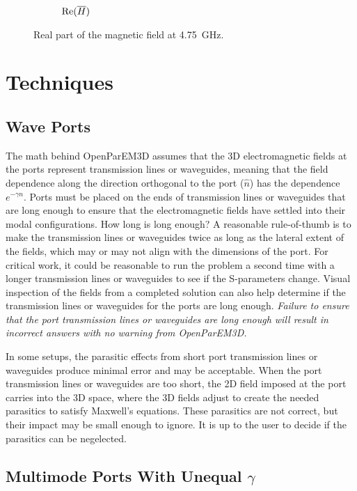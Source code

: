\documentclass[titlepage]{article}
\renewcommand\_{\textunderscore\linebreak[1]}
\begin{document}
\begin{itemize}
\begin{figure}[H]
\begin{subfigure}{0.6\textwidth}
     \caption{$\textnormal{Re}(\overline{H})$}
  \end{subfigure}
  \caption{Real part of the magnetic field at 4.75~GHz.}
  \label{fig:monopole_ReH}
\end{figure}


\end{itemize}

\section{Techniques}

\subsection{Wave Ports}

The math behind OpenParEM3D assumes that the 3D electromagnetic fields at the ports represent transmission lines or waveguides, meaning that the field dependence along the direction orthogonal to the port ($\hat{n}$) has the dependence $e^{-\gamma n}$.  Ports must be placed on the ends of transmission lines or waveguides that are long enough to ensure that the electromagnetic fields have settled into their modal configurations.  How long is long enough?  A reasonable rule-of-thumb is to make the transmission lines or waveguides twice as long as the lateral extent of the fields, which may or may not align with the dimensions of the port.  For critical work, it could be reasonable to run the problem a second time with a longer transmission lines or waveguides to see if the S-parameters change.  Visual inspection of the fields from a completed solution can also help determine if the transmission lines or waveguides for the ports are long enough.  \textit{Failure to ensure that the port transmission lines or waveguides are long enough will result in incorrect answers with no warning from OpenParEM3D.}

In some setups, the parasitic effects from short port transmission lines or waveguides produce minimal error and may be acceptable.  When the port transmission lines or waveguides are too short, the 2D field imposed at the port carries into the 3D space, where the 3D fields adjust to create the needed parasitics to satisfy Maxwell's equations.  These parasitics are not correct, but their impact may be small enough to ignore.  It is up to the user to decide if the parasitics can be negelected.

\subsection{Multimode Ports With Unequal $\gamma$}
\end{document}
